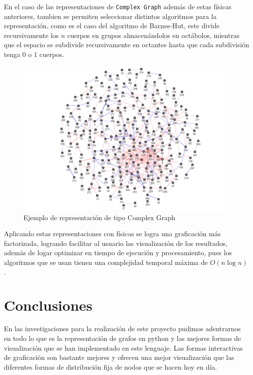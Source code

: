 \documentclass[a4paper,10pt,twocolumn]{article}
\begin{document}
En el caso de las representaciones de \texttt{Complex Graph} además de estas físicas anteriores, tambien se permiten seleccionar distintos algoritmos para la representación, como es el caso del algoritmo de Barnes-Hut, este divide recursivamente los $n$ cuerpos en grupos almacenándolos en octábolos, mientras que el espacio se subdivide recursivamente en octantes hasta que cada subdivisión tenga $0$ o $1$ cuerpos.\\

\begin{figure}[h!]%
\includegraphics[scale=0.25]{complex.jpg}
\caption{Ejemplo de representación de tipo Complex Graph}
\end{figure}

Aplicando estas representaciones con físicas se logra una graficación más factorizada, logrando facilitar al usuario las visualización
de los resultados, además de logar optimizar en tiempo de ejecución y procesamiento, pues los algoritmos que se usan tienen una complejidad temporal máxima de $O(n\log{n})$.\\

\section{Conclusiones}\label{sec:conc}

En las investigaciones para la realización de este proyecto pudimos adentrarnos en todo lo que es la representación de grafos en python y las mejores formas de visualización que se han implementado en este lenguaje. Las formas interactivas de graficación son bastante mejores y ofrecen una mejor visualización que las diferentes formas de distribución fija de nodos que se hacen hoy en día.\\
\end{document}
